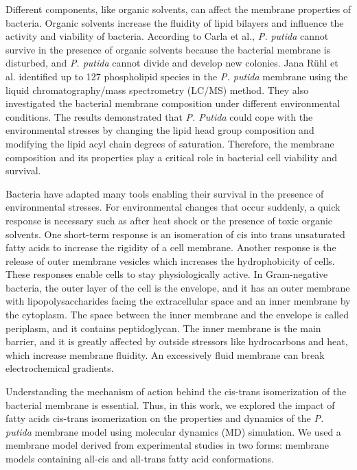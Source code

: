 Different components, like organic solvents, can affect the membrane properties of bacteria. 
Organic solvents increase the fluidity of lipid bilayers and influence the activity and viability of bacteria. According to Carla et al., \emph{P. putida} cannot survive in the presence of organic solvents because the bacterial membrane is disturbed, and \emph{P. putida} cannot divide and develop new colonies.\cite{de2004mycobacterium}
Jana R{\"u}hl et al. identified up to 127 phospholipid species in the \emph{P. putida} membrane using the liquid chromatography/mass spectrometry (LC/MS) method.\cite{ruhl2012glycerophospholipid} 
They also investigated the bacterial membrane composition under different environmental conditions. The results demonstrated that \emph{P. Putida} could cope with the environmental stresses by changing the lipid head group composition and modifying the lipid acyl chain degrees of saturation. 
Therefore, the membrane composition and its properties play a critical role in bacterial cell viability and survival.

Bacteria have adapted many tools enabling their survival in the presence of environmental stresses. 
For environmental changes that occur suddenly, a quick response is necessary such as after heat shock or the presence of toxic organic solvents. 
One short-term response is an isomeration of cis into trans unsaturated fatty acids to increase the rigidity of a cell membrane\cite{heipieper1992conversion,okuyama1991cis}. 
Another response is the release of outer membrane vesicles which increases the hydrophobicity of cells\cite{schwechheimer2015outer,beveridge1999structures,kuehn2005bacterial,mashburn2008gram}.
These responses enable cells to stay physiologically active. In Gram-negative bacteria, the outer layer of the cell is the envelope, and it has an outer membrane with lipopolysaccharides facing the extracellular space and an inner membrane by the cytoplasm. The space between the inner membrane and the envelope is called periplasm, and it contains peptidoglycan. The inner membrane is the main barrier, and it is greatly affected by outside stressors like hydrocarbons and heat, which increase membrane fluidity\cite{beney2001influence,hazel1990role,heipieper1994adaptation}.
An excessively fluid membrane can break electrochemical gradients\cite{isken1998bacteria}.

Understanding the mechanism of action behind the cis-trans isomerization of the bacterial membrane is essential. 
Thus, in this work, we explored the impact of fatty acids cis-trans isomerization on the properties and dynamics of the \emph{P. putida} membrane model using molecular dynamics (MD) simulation. 
We used a membrane model derived from experimental studies \cite{isken1998bacteria} in two forms: membrane models containing all-cis and all-trans fatty acid conformations.


\newpage